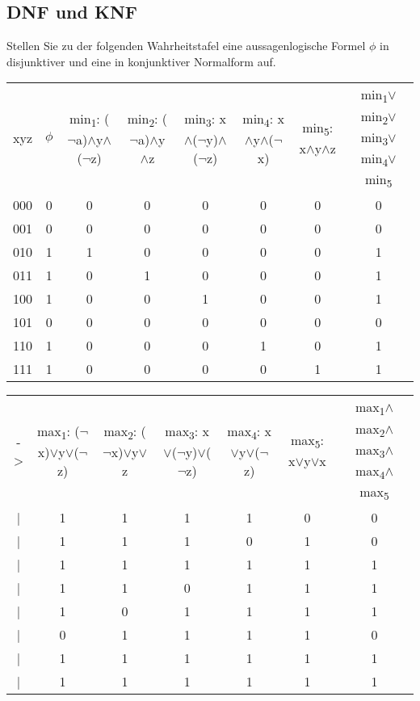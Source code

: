 \subsection{DNF und KNF}
Stellen Sie zu der folgenden Wahrheitstafel eine aussagenlogische Formel $\phi$ in
disjunktiver und eine in konjunktiver Normalform auf.\\
{
    \tiny
    \begin{tabular}{cccccccc}
        xyz & 
        $\phi$ & 
        min\textsubscript{1}: ($\neg$a)$\wedge$y$\wedge$($\neg$z) & 
        min\textsubscript{2}: ($\neg$a)$\wedge$y$\wedge$z & 
        min\textsubscript{3}: x$\wedge$($\neg$y)$\wedge$($\neg$z) & 
        min\textsubscript{4}: x$\wedge$y$\wedge$($\neg$x) & 
        min\textsubscript{5}: x$\wedge$y$\wedge$z & 
        min\textsubscript{1}$\vee$min\textsubscript{2}$\vee$min\textsubscript{3}$\vee$min\textsubscript{4}$\vee$min\textsubscript{5}\\
        000 & 0 & 0 & 0 & 0 & 0 & 0 & 0\\
        001 & 0 & 0 & 0 & 0 & 0 & 0 & 0\\
        010 & 1 & 1 & 0 & 0 & 0 & 0 & 1\\
        011 & 1 & 0 & 1 & 0 & 0 & 0 & 1\\
        100 & 1 & 0 & 0 & 1 & 0 & 0 & 1\\
        101 & 0 & 0 & 0 & 0 & 0 & 0 & 0\\
        110 & 1 & 0 & 0 & 0 & 1 & 0 & 1\\
        111 & 1 & 0 & 0 & 0 & 0 & 1 & 1
    \end{tabular}
    \begin{tabular}{ccccccc}
        ->&
        max\textsubscript{1}: ($\neg$x)$\vee$y$\vee$($\neg$z)&
        max\textsubscript{2}: ($\neg$x)$\vee$y$\vee$z&
        max\textsubscript{3}: x$\vee$($\neg$y)$\vee$($\neg$z)&
        max\textsubscript{4}: x$\vee$y$\vee$($\neg$z)&
        max\textsubscript{5}: x$\vee$y$\vee$x&
        max\textsubscript{1}$\wedge$max\textsubscript{2}$\wedge$max\textsubscript{3}$\wedge$max\textsubscript{4}$\wedge$max\textsubscript{5}\\
        | & 1 & 1 & 1 & 1 & 0 & 0 \\
        | & 1 & 1 & 1 & 0 & 1 & 0 \\
        | & 1 & 1 & 1 & 1 & 1 & 1 \\
        | & 1 & 1 & 0 & 1 & 1 & 1 \\
        | & 1 & 0 & 1 & 1 & 1 & 1 \\
        | & 0 & 1 & 1 & 1 & 1 & 0 \\
        | & 1 & 1 & 1 & 1 & 1 & 1 \\
        | & 1 & 1 & 1 & 1 & 1 & 1 
    \end{tabular}
}
